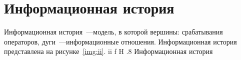 \chapter{Информационная история}

Информационная история~---модель, в которой вершины: срабатывания операторов,
дуги~---информационные отношения.
Информационная история представлена на рисунке~\ref{img:ii}.
	{ii}
	{f}
	{H}
	{.8\textwidth}
	{Информационная история}
